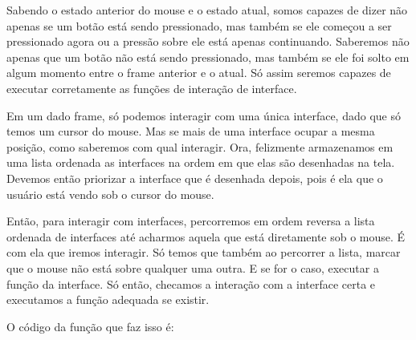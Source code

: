 Sabendo o estado anterior do mouse e o estado atual, somos capazes de
dizer não apenas se um botão está sendo pressionado, mas também se ele
começou a ser pressionado agora ou a pressão sobre ele está apenas
continuando. Saberemos não apenas que um botão não está sendo
pressionado, mas também se ele foi solto em algum momento entre o
frame anterior e o atual. Só assim seremos capazes de executar
corretamente as funções de interação de interface.

Em um dado frame, só podemos interagir com uma única interface, dado
que só temos um cursor do mouse. Mas se mais de uma interface ocupar a
mesma posição, como saberemos com qual interagir. Ora, felizmente
armazenamos em uma lista ordenada as interfaces na ordem em que elas
são desenhadas na tela. Devemos então priorizar a interface que é
desenhada depois, pois é ela que o usuário está vendo sob o cursor do
mouse.

Então, para interagir com interfaces, percorremos em ordem reversa a
lista ordenada de interfaces até acharmos aquela que está diretamente
sob o mouse. É com ela que iremos interagir. Só temos que também ao
percorrer a lista, marcar que o mouse não está sobre qualquer uma
outra. E se for o caso, executar a função  da
interface. Só então, checamos a interação com a interface certa e
executamos a função adequada se existir.

O código da função que faz isso é:

